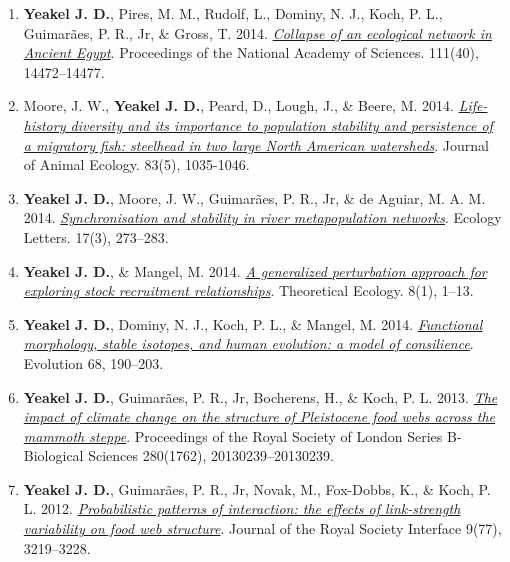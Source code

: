 \documentclass[margin,line,12pt]{res}
\begin{document}
\begin{resume}
\begin{enumerate}
\item \textbf{Yeakel J. D.}, Pires, M. M., Rudolf, L., Dominy, N. J., Koch, P. L., Guimar\~aes, P. R., Jr, \& Gross, T. 2014. \href{https://www.pnas.org/content/111/40/14472}{\emph{Collapse of an ecological network in Ancient Egypt}}. Proceedings of the National Academy of Sciences. 111(40), 14472–14477.

\item Moore, J. W., \textbf{Yeakel J. D.}, Peard, D., Lough, J., \& Beere, M. 2014. \href{https://besjournals.onlinelibrary.wiley.com/doi/10.1111/1365-2656.12212}{\emph{Life-history diversity and its importance to population stability and persistence of a migratory fish: steelhead in two large North American watersheds}}. Journal of Animal Ecology. 83(5), 1035-1046.

\item \textbf{Yeakel J. D.}, Moore, J. W., Guimar\~aes, P. R., Jr, \& de Aguiar, M. A. M. 2014. \href{https://onlinelibrary.wiley.com/doi/abs/10.1111/ele.12228}{\emph{Synchronisation and stability in river metapopulation networks}}. Ecology Letters. 17(3), 273–283.

\item \textbf{Yeakel J. D.}, \& Mangel, M. 2014. \href{https://link.springer.com/article/10.1007/s12080-014-0230-z}{\emph{A generalized perturbation approach for exploring stock recruitment relationships}}. Theoretical Ecology. 8(1), 1–13.

\item \textbf{Yeakel J. D.}, Dominy, N. J., Koch, P. L., \& Mangel, M. 2014. \href{https://onlinelibrary.wiley.com/doi/full/10.1111/evo.12240}{\emph{Functional morphology, stable isotopes, and human evolution: a model of consilience}}. Evolution 68, 190–203.

\item \textbf{Yeakel J. D.}, Guimar\~aes, P. R., Jr, Bocherens, H., \& Koch, P. L. 2013. \href{https://royalsocietypublishing.org/doi/10.1098/rspb.2013.0239}{\emph{The impact of climate change on the structure of Pleistocene food webs across the mammoth steppe}}. Proceedings of the Royal Society of London Series B-Biological Sciences 280(1762), 20130239–20130239.

\item \textbf{Yeakel J. D.}, Guimar\~aes, P. R., Jr, Novak, M., Fox-Dobbs, K., \& Koch, P. L. 2012. \href{https://royalsocietypublishing.org/doi/10.1098/rsif.2012.0481}{\emph{Probabilistic patterns of interaction: the effects of link-strength variability on food web structure}}. Journal of the Royal Society Interface 9(77), 3219–3228.


\end{enumerate}
\end{resume}
\end{document}
